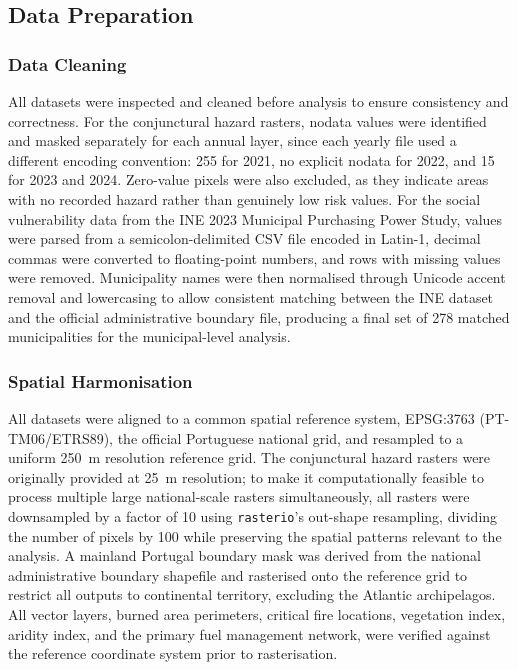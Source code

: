 \subsection{Data Preparation}

\subsubsection*{Data Cleaning}
All datasets were inspected and cleaned before analysis to ensure consistency
and correctness. For the conjunctural hazard rasters, nodata values were
identified and masked separately for each annual layer, since each yearly file
used a different encoding convention: 255 for 2021, no explicit nodata for 2022,
and 15 for 2023 and 2024. Zero-value pixels were also excluded, as they indicate
areas with no recorded hazard rather than genuinely low risk values. For the
social vulnerability data from the INE 2023 Municipal Purchasing Power Study,
values were parsed from a semicolon-delimited CSV file encoded in Latin-1,
decimal commas were converted to floating-point numbers, and rows with missing
values were removed. Municipality names were then normalised through Unicode
accent removal and lowercasing to allow consistent matching between the INE
dataset and the official administrative boundary file, producing a final set
of 278 matched municipalities for the municipal-level analysis.\\
\newpage

\subsubsection*{Spatial Harmonisation}
All datasets were aligned to a common spatial reference system, EPSG:3763
(PT-TM06/ETRS89), the official Portuguese national grid, and resampled to a
uniform 250~m resolution reference grid. The conjunctural hazard rasters were
originally provided at 25~m resolution; to make it computationally feasible
to process multiple large national-scale rasters simultaneously, all rasters
were downsampled by a factor of 10 using \texttt{rasterio}'s out-shape
resampling, dividing the number of pixels by 100 while preserving the spatial
patterns relevant to the analysis. A mainland Portugal boundary mask was
derived from the national administrative boundary shapefile and rasterised
onto the reference grid to restrict all outputs to continental territory,
excluding the Atlantic archipelagos. All vector layers, burned area perimeters,
critical fire locations, vegetation index, aridity index, and the primary fuel
management network, were verified against the reference coordinate system prior
to rasterisation.\\

